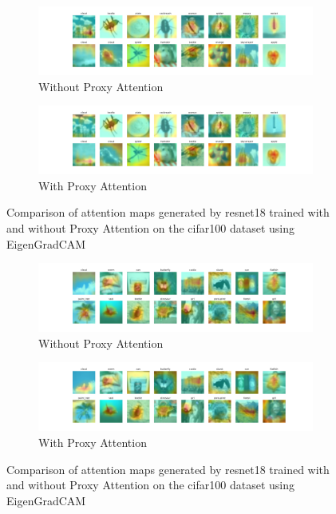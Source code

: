 \documentclass[a4paper,11pt,openright]{book}
\begin{document}
\begin{figure}[!htb]
    \centering
    \begin{subfigure}[b]{1\textwidth}
        \includegraphics[width=\textwidth]{images/cifar100_resnet18_noproxy_1.pdf}
        \caption{Without Proxy Attention}
    \end{subfigure}
    \hfill
    \begin{subfigure}[b]{1\textwidth}
        \includegraphics[width=\textwidth]{images/cifar100_resnet18_proxy_1.pdf}
        \caption{With Proxy Attention}
    \end{subfigure}
    \caption{Comparison of attention maps generated by resnet18 trained with and without Proxy Attention on the cifar100 dataset using EigenGradCAM}
\end{figure}


\begin{figure}[!htb]
    \centering
    \begin{subfigure}[b]{1\textwidth}
        \includegraphics[width=\textwidth]{images/cifar100_resnet18_noproxy_2.pdf}
        \caption{Without Proxy Attention}
    \end{subfigure}
    \hfill
    \begin{subfigure}[b]{1\textwidth}
        \includegraphics[width=\textwidth]{images/cifar100_resnet18_proxy_2.pdf}
        \caption{With Proxy Attention}
    \end{subfigure}
    \caption{Comparison of attention maps generated by resnet18 trained with and without Proxy Attention on the cifar100 dataset using EigenGradCAM}
\end{figure}
\end{document}
